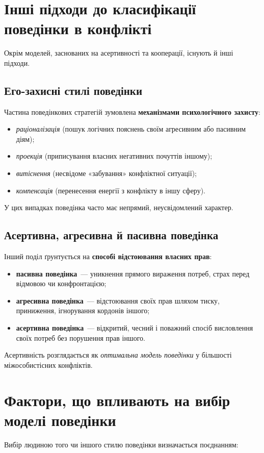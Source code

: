 \documentclass[12pt,a4paper]{article}
\begin{document}
    \section*{Інші підходи до класифікації поведінки в конфлікті}
    Окрім моделей, заснованих на асертивності та кооперації, існують й інші підходи.

    \subsection*{Его-захисні стилі поведінки}
    Частина поведінкових стратегій зумовлена \textbf{механізмами психологічного захисту}:
    \begin{itemize}
        \item \textit{раціоналізація} (пошук логічних пояснень своїм агресивним або пасивним діям);
        \item \textit{проекція} (приписування власних негативних почуттів іншому);
        \item \textit{витіснення} (несвідоме «забування» конфліктної ситуації);
        \item \textit{компенсація} (перенесення енергії з конфлікту в іншу сферу).
    \end{itemize}
    У цих випадках поведінка часто має непрямий, неусвідомлений характер.

    \subsection*{Асертивна, агресивна й пасивна поведінка}
    Інший поділ ґрунтується на \textbf{способі відстоювання власних прав}:
    \begin{itemize}
        \item \textbf{пасивна поведінка}~--- уникнення прямого вираження потреб, страх перед відмовою чи конфронтацією;
        \item \textbf{агресивна поведінка}~--- відстоювання своїх прав шляхом тиску, приниження, ігнорування кордонів іншого;
        \item \textbf{асертивна поведінка}~--- відкритий, чесний і поважний спосіб висловлення своїх потреб без порушення прав іншого.
    \end{itemize}

    Асертивність розглядається як \textit{оптимальна модель поведінки} у більшості міжособистісних конфліктів.

    \section*{Фактори, що впливають на вибір моделі поведінки}
    Вибір людиною того чи іншого стилю поведінки визначається поєднанням:
\end{document}
